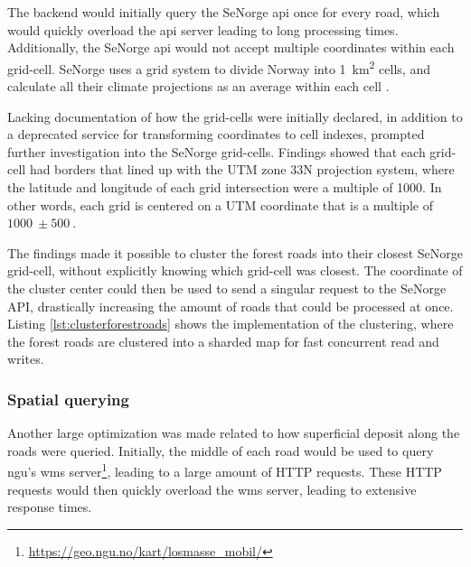 The backend would initially query the SeNorge \acrshort{api} once for every road, which would quickly overload the \acrshort{api} server leading to long processing times. Additionally, the SeNorge \acrshort{api} would not accept multiple coordinates within each grid-cell. SeNorge uses a grid system to divide Norway into \qty{1}{\kilo\meter\squared} cells, and calculate all their climate projections as an average within each cell \cite{senorge_watermap}. 

Lacking documentation of how the grid-cells were initially declared, in addition to a deprecated service for transforming coordinates to cell indexes, prompted further investigation into the SeNorge grid-cells. Findings showed that each grid-cell had borders that lined up with the UTM zone 33N projection system, where the latitude and longitude of each grid intersection were a multiple of \qty{1000}{}. In other words, each grid is centered on a UTM coordinate that is a multiple of $\qty{1000}{}\pm\qty{500}{}$.

The findings made it possible to cluster the forest roads into their closest SeNorge grid-cell, without explicitly knowing which grid-cell was closest. The coordinate of the cluster center could then be used to send a singular request to the SeNorge API, drastically increasing the amount of roads that could be processed at once. Listing \ref{lst:clusterforestroads} shows the implementation of the clustering, where the forest roads are clustered into a sharded map for fast concurrent read and writes.

\begin{figure}[h]

\end{figure}

\subsubsection{Spatial querying}\label{subsubsec:impl:server:optimization:spatialquerying}

Another large optimization was made related to how superficial deposit along the roads were queried. Initially, the middle of each road would be used to query \acrshort{ngu}'s \Gls{wms} server\footnote{\url{https://geo.ngu.no/kart/losmasse_mobil/}}, leading to a large amount of HTTP requests. These HTTP requests would then quickly overload the \Gls{wms} server, leading to extensive response times.

